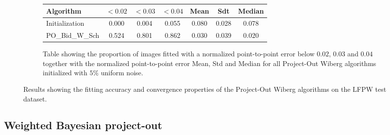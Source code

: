 \begin{figure}[p]
\begin{subfigure}{0.48\textwidth}
	    \label{fig:mean_cost_vs_iters2_bpo_w_5}
	\end{subfigure}
	\par\bigskip\bigskip
	\begin{subfigure}{\textwidth}
		\center
		\begin{tabular}{lcccccc}
		    \toprule
		    Algorithm & $<0.02$ & $<0.03$ & $<0.04$ & Mean & Sdt & Median 
		    \\
		    \midrule
		    Initialization & 0.000 & 0.004 & 0.055 & 0.080 & 0.028 & 0.078
		    \\ 
		    PO\_Bid\_W\_Sch & 0.524 & 0.801 & 0.862 & 0.030 & 0.039 & 0.020
		    \\
		    \bottomrule
	  	\end{tabular}
	  	\caption{Table showing the proportion of images fitted with a normalized point-to-point error below $0.02$, $0.03$ and $0.04$ together with the normalized point-to-point error Mean, Std and Median for all Project-Out Wiberg algorithms initialized with $5\%$ uniform noise.}
	    \label{tab:stats_bpo_w_5}
	\end{subfigure}
	\caption{Results showing the fitting accuracy and convergence properties of the Project-Out Wiberg algorithms on the LFPW test dataset.}
	\label{fig:bpo_w_5}
\end{figure}








\subsection{Weighted Bayesian project-out}

